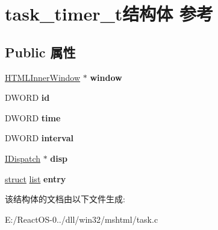 \hypertarget{structtask__timer__t}{}\section{task\+\_\+timer\+\_\+t结构体 参考}
\label{structtask__timer__t}
\subsection*{Public 属性}
\begin{DoxyCompactItemize}
\item 
\mbox{\label{structtask__timer__t_a0b246d56614d347602818eeeee4bcb7e}} 
\hyperlink{struct_h_t_m_l_inner_window}{H\+T\+M\+L\+Inner\+Window} $\ast$ {\bfseries window}
\item 
\mbox{\label{structtask__timer__t_a50caf085db5f03080167dbb37241dc55}} 
D\+W\+O\+RD {\bfseries id}
\item 
\mbox{\label{structtask__timer__t_a5a8cbf66281a131f1812ab280f6bdeaa}} 
D\+W\+O\+RD {\bfseries time}
\item 
\mbox{\label{structtask__timer__t_a42568fc4868f0a550f3c7ca715111aaa}} 
D\+W\+O\+RD {\bfseries interval}
\item 
\mbox{\label{structtask__timer__t_ac60ca92e16157c13db5421c8c2577cba}} 
\hyperlink{interface_i_dispatch}{I\+Dispatch} $\ast$ {\bfseries disp}
\item 
\mbox{\label{structtask__timer__t_a4cb2e05cf79c47ddfe0c9ace558a250d}} 
\hyperlink{interfacestruct}{struct} \hyperlink{classlist}{list} {\bfseries entry}
\end{DoxyCompactItemize}


该结构体的文档由以下文件生成\+:\begin{DoxyCompactItemize}
\item 
E\+:/\+React\+O\+S-\/0../dll/win32/mshtml/task.\+c\end{DoxyCompactItemize}

